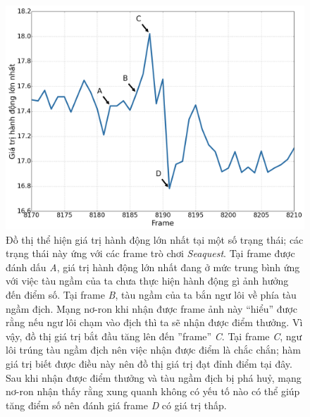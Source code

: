	\begin{figure}
		\centering
		\includegraphics[width=\textwidth]{dqn_seaquest_frames}
		\caption[Đồ thị giá trị hành động của một số trạng thái trong một lần chơi game]{
		Đồ thị thể hiện giá trị hành động lớn nhất tại một số trạng thái; các trạng thái này ứng với các frame trò chơi \textit{Seaquest}.
		Tại frame được đánh dấu \textit{A}, giá trị hành động lớn nhất đang ở mức trung bình ứng với việc tàu ngầm của ta chưa thực hiện hành động gì ảnh hưởng đến điểm số.
		Tại frame \textit{B}, tàu ngầm của ta bắn ngư lôi về phía tàu ngầm địch.
		Mạng nơ-ron khi nhận được frame ảnh này ``hiểu'' được rằng nếu ngư lôi chạm vào địch thì ta sẽ nhận được điểm thưởng.
		Vì vậy, đồ thị giá trị bắt đầu tăng lên đến ''frame'' \textit{C}.
		Tại frame \textit{C}, ngư lôi trúng tàu ngầm địch nên việc nhận được điểm là chắc chắn; hàm giá trị biết được điều này nên đồ thị giá trị đạt đỉnh điểm tại đây.
		Sau khi nhận được điểm thưởng và tàu ngầm địch bị phá huỷ, mạng nơ-ron nhận thấy rằng xung quanh không có yếu tố nào có thể giúp tăng điểm số nên đánh giá frame \textit{D} có giá trị thấp.		
		}
		\label{fig_seaquest_frames}
	\end{figure}
